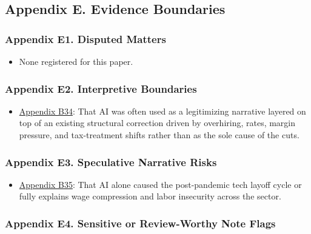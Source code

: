 \documentclass[
  american,
  11pt,
  letterpaper,
]{article}
\providecommand{\tightlist}{%
  \setlength{\itemsep}{0pt}\setlength{\parskip}{0pt}}
\begin{document}
\subsection{Appendix E. Evidence
Boundaries}\label{appendix-e.-evidence-boundaries}

\subsubsection{Appendix E1. Disputed
Matters}\label{appendix-e1-disputed-matters}

\begin{itemize}
\tightlist
\item
  None registered for this paper.
\end{itemize}

\subsubsection{Appendix E2. Interpretive
Boundaries}\label{appendix-e2-interpretive-boundaries}

\begin{itemize}
\tightlist
\item
  \hyperref[appendix-b34-ai-was-often-used-as-a-legitimizing-narrative-layered-on-top-of-an-existing-struc]{Appendix
  B34}: That AI was often used as a legitimizing narrative layered on
  top of an existing structural correction driven by overhiring, rates,
  margin pressure, and tax-treatment shifts rather than as the sole
  cause of the cuts.
\end{itemize}

\subsubsection{Appendix E3. Speculative Narrative
Risks}\label{appendix-e3-speculative-narrative-risks}

\begin{itemize}
\tightlist
\item
  \hyperref[appendix-b35-ai-alone-caused-the-post-pandemic-tech-layoff-cycle-or-fully-explains-wage-compre]{Appendix
  B35}: That AI alone caused the post-pandemic tech layoff cycle or
  fully explains wage compression and labor insecurity across the
  sector.
\end{itemize}

\subsubsection{Appendix E4. Sensitive or Review-Worthy Note
Flags}\label{appendix-e4-sensitive-or-review-worthy-note-flags}
\end{document}
